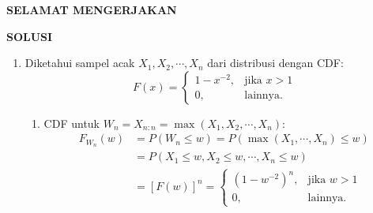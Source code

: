 \documentclass[11pt,letterpaper]{article}
\begin{document}
\begin{center}
  \textbf{SELAMAT MENGERJAKAN}
\end{center}

\newpage
\begin{center}
  \textbf{SOLUSI}
\end{center}

\begin{enumerate}
  \item
        Diketahui sampel acak $X_1, X_2, \cdots, X_n$ dari distribusi dengan CDF:
        \[
          F(x) = \begin{cases}
            1 - x^{-2}, & \text{jika } x > 1 \\
            0,          & \text{lainnya.}
          \end{cases}
        \]
        \begin{enumerate}[label=(\alph*)]
          \item CDF untuk $W_n = X_{n:n} = \max(X_1, X_2, \cdots, X_n)$:
                \begin{align*}
                  F_{W_n}(w) & = P(W_n \le w) = P(\max(X_1, \cdots, X_n) \le w)               \\
                             & = P(X_1 \le w, X_2 \le w, \cdots, X_n \le w)                   \\
                             & = [F(w)]^n = \begin{cases}
                                              \left(1 - w^{-2}\right)^n, & \text{jika } w > 1 \\
                                              0,                         & \text{lainnya.}
                                            \end{cases}
                \end{align*}


\end{enumerate}
\end{enumerate}
\end{document}
